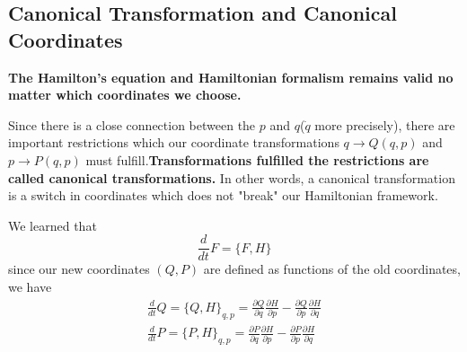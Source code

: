 \subsection{Canonical Transformation and Canonical Coordinates}
\textbf{The Hamilton's equation and Hamiltonian formalism remains valid no matter which coordinates we choose.}

Since there is a close connection between the $p$ and $q$($\dot{q}$ more precisely), there are important restrictions which our coordinate transformations $q \rightarrow Q(q, p)$ and $p \rightarrow P(q, p)$ must fulfill.\textbf{Transformations fulfilled the restrictions are called canonical transformations.} In other words, a canonical transformation is a switch in coordinates which does not "break" our Hamiltonian framework.

We learned that 
$$
\frac{d}{d t} F=\{F, H\}
$$
since our new coordinates $(Q, P)$ are defined as functions of the old coordinates, we have
\begin{equation}
    \begin{array}{l}
{\frac{d}{d t} Q=\{Q, H\}_{q, p}=\frac{\partial Q}{\partial q} \frac{\partial H}{\partial p}-\frac{\partial Q}{\partial p} \frac{\partial H}{\partial q}} \\
{\frac{d}{d t} P=\{P, H\}_{q, p}=\frac{\partial P}{\partial q} \frac{\partial H}{\partial p}-\frac{\partial P}{\partial p} \frac{\partial H}{\partial q}}
\label{poissonbracket}
\end{array}
\end{equation}

